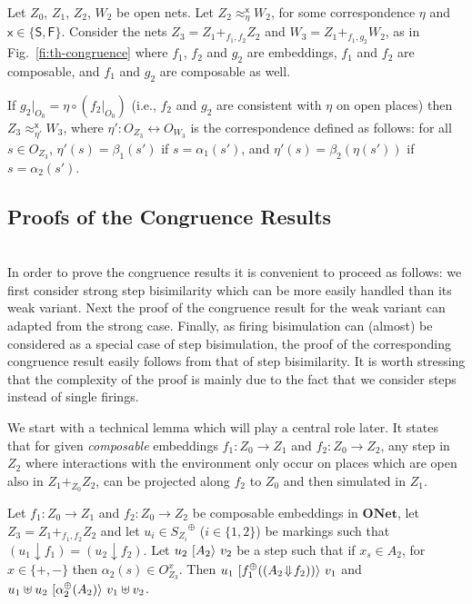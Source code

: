 \documentclass{LMCS}
\newcommand{\mjoin}{\ensuremath{\uplus}}
\newcommand{\mon}[1]{\ensuremath{{#1}^\oplus}}
\newcommand{\monSub}[2]{\ensuremath{{#1}_{#2}^\oplus}}
\newcommand{\res}[2]{\ensuremath{({#1}\!\downarrow\!{#2})}}
\newcommand{\sres}[2]{\ensuremath{({#1}\!\Downarrow\!{#2})}}
\newcommand{\comp}[1]{\ensuremath{+}_{#1}}
\newcommand{\trans}[1]{\ensuremath{\ [\/{#1}\/\rangle}\ }
\newcommand{\onet}{\ensuremath{\mathbf{ONet}}}
\begin{document}
\begin{thm}
  \label{th:congruence}
  Let $Z_0$, $Z_1$, $Z_2$, $W_2$ be open nets.
Let $Z_2 \approx_\eta^{\mathsf{x}} W_2$, for some correspondence $\eta$ and
  ${\mathsf{x}} \in \{ \mathsf{S}, \mathsf{F} \}$. Consider the nets $Z_3 = Z_1
  \comp{f_1,f_2} Z_2$ and $W_3 = Z_1 \comp{f_1,g_2} W_2$, as in
  Fig.~\ref{fi:th-congruence} where $f_1$, $f_2$ and $g_2$ are
  embeddings, $f_1$ and $f_2$ are composable, and $f_1$ and $g_2$ are
  composable as well.

  If $g_2|_{O_0} = \eta \circ (f_2|_{O_0})$ (i.e., $f_2$ and $g_2$ are
  consistent with $\eta$ on open places) then $Z_3 \approx_{\eta'}^{\mathsf{x}}
  W_3$, where $\eta': O_{Z_3} \leftrightarrow O_{W_3}$ is the
  correspondence defined as follows:
  for all $s \in O_{Z_3}$, $\eta'(s) = \beta_1(s')$ if $s =
  \alpha_1(s')$, and  $\eta'(s) = \beta_2(\eta(s'))$ if $s =
  \alpha_2(s')$.
\end{thm}




\subsection{Proofs of the Congruence Results}
\ \\

\noindent
In order to prove the congruence results it is convenient to proceed
as follows: we first consider strong step bisimilarity which can be
more easily handled than its weak variant.  Next the proof of the
congruence result for the weak variant can adapted from the strong
case. Finally, as firing bisimulation can (almost) be considered as a
special case of step bisimulation, the proof of the corresponding
congruence result easily follows from that of step bisimilarity. It is
worth stressing that the complexity of the proof is mainly due to the
fact that we consider steps instead of single firings. 

We start with a technical lemma which will play a central role 
later.
It states that for given \emph{composable}
embeddings $f_1 :Z_0 \to Z_1$ and $f_2: Z_0 \to Z_2$, any step in
$Z_2$ where interactions with the environment only occur on places
which are open also in $Z_1 +_{Z_0} Z_2$, can be projected along $f_2$
to $Z_0$ and then simulated in $Z_1$.

\begin{lem}
  \label{le:move-step}
  Let $f_1 : Z_0 \to Z_1$ and $f_2 : Z_0 \to Z_2$ be composable
  embeddings in $\onet$, let $Z_3 = Z_1 \comp{f_1,f_2} Z_2$ and let
  $u_i \in \mon{S_{Z_i}}$ ($i \in \{ 1, 2\}$) be markings such that
  $\res{u_1}{f_1} = \res{u_2}{f_2}$.  Let $u_2 \trans{A_2} v_2$ be a
  step such that if $x_s \in A_2$, for $x \in \{ +, - \}$ then
  $\alpha_2(s) \in O_{Z_3}^x$. Then $u_1
  \trans{\monSub{f}{1}(\sres{A_2}{f_2})} v_1$ and $u_1 \mjoin u_2
  \trans{\monSub{\alpha}{2}(A_2)} v_1 \mjoin v_2$.
\end{lem}
\end{document}
